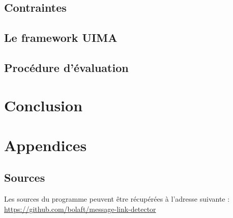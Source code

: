 \documentclass[a4paper]{article}
\begin{document}
	\subsection{Contraintes}

	\subsection{Le framework UIMA}

	\subsection{Procédure d'évaluation}

\section{Conclusion}

\section{Appendices}

	\subsection{Sources}

		Les sources du programme peuvent être récupérées à l'adresse suivante : \url{https://github.com/bolaft/message-link-detector}
\end{document}
